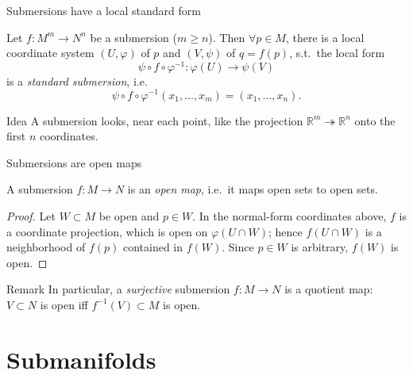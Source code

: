 \documentclass[10pt]{beamer}
\newcommand{\R}{\mathbb{R}}
\begin{document}
\begin{frame}{Submersions have a local standard form}
	\begin{theorem}
		Let $f : M^{m} \longrightarrow N^{n}$ be a submersion ($m \geq n$).
		Then $\forall p \in M$, there is a local coordinate system
		$(U, \varphi)$ of $p$ and $(V, \psi)$ of $q = f(p)$, s.t.\ the
		local form
		\[
			\psi \circ f \circ \varphi^{-1} : \varphi(U) \longrightarrow \psi(V)
		\]
		is a \emph{standard submersion}, i.e.
		\[
			\psi \circ f \circ \varphi^{-1}(x_{1}, \dots, x_{m})
			= (x_{1}, \dots, x_{n}).
		\]
	\end{theorem}
	\begin{block}{Idea}
		A submersion looks, near each point, like the projection
		$\R^{m} \twoheadrightarrow \R^{n}$ onto the first $n$ coordinates.
	\end{block}
\end{frame}

\begin{frame}{Submersions are open maps}
	\begin{corollary}
		A submersion $f : M \longrightarrow N$ is an \emph{open map},
		i.e.\ it maps open sets to open sets.
	\end{corollary}
	\begin{proof}
		Let $W \subset M$ be open and $p \in W$. In the normal-form
		coordinates above, $f$ is a coordinate projection, which is open
		on $\varphi(U \cap W)$; hence $f(U \cap W)$ is a neighborhood of
		$f(p)$ contained in $f(W)$. Since $p \in W$ is arbitrary, $f(W)$
		is open.
	\end{proof}
	\medskip
	\begin{block}{Remark}
		In particular, a \emph{surjective} submersion $f : M \to N$ is a
		quotient map: $V \subset N$ is open iff $f^{-1}(V) \subset M$ is
		open.
	\end{block}
\end{frame}

\section{Submanifolds}
\end{document}
